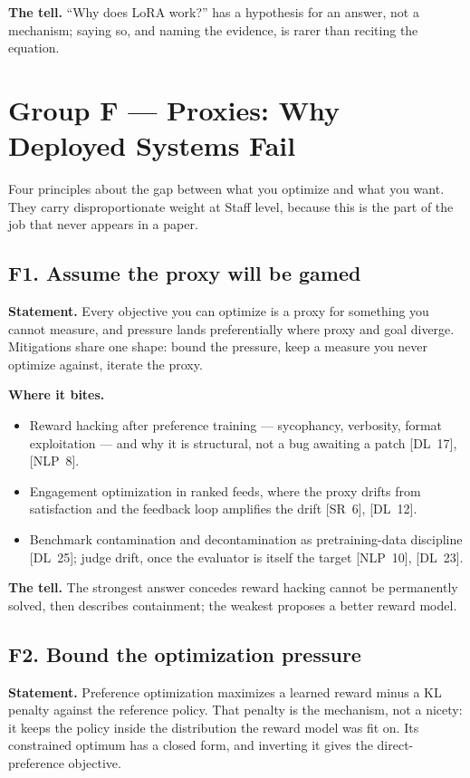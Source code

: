 \textbf{The tell.} ``Why does LoRA work?'' has a hypothesis for an answer, not a mechanism; saying so, and naming the evidence, is rarer than reciting the equation.

\section*{Group F --- Proxies: Why Deployed Systems Fail}

Four principles about the gap between what you optimize and what you want. They carry disproportionate weight at Staff level, because this is the part of the job that never appears in a paper.

\subsection*{F1. Assume the proxy will be gamed}

\textbf{Statement.} Every objective you can optimize is a proxy for something you cannot measure, and pressure lands preferentially where proxy and goal diverge. Mitigations share one shape: bound the pressure, keep a measure you never optimize against, iterate the proxy.

\textbf{Where it bites.}
\begin{itemize}[itemsep=1pt,topsep=2pt,leftmargin=1.3em]
\item Reward hacking after preference training --- sycophancy, verbosity, format exploitation --- and why it is structural, not a bug awaiting a patch [DL~17], [NLP~8].
\item Engagement optimization in ranked feeds, where the proxy drifts from satisfaction and the feedback loop amplifies the drift [SR~6], [DL~12].
\item Benchmark contamination and decontamination as pretraining-data discipline [DL~25]; judge drift, once the evaluator is itself the target [NLP~10], [DL~23].
\end{itemize}

\textbf{The tell.} The strongest answer concedes reward hacking cannot be permanently solved, then describes containment; the weakest proposes a better reward model.

\subsection*{F2. Bound the optimization pressure}

\textbf{Statement.} Preference optimization maximizes a learned reward minus a KL penalty against the reference policy. That penalty is the mechanism, not a nicety: it keeps the policy inside the distribution the reward model was fit on. Its constrained optimum has a closed form, and inverting it gives the direct-preference objective.

